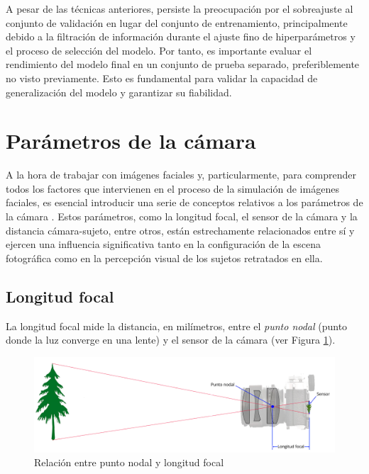 A pesar de las técnicas anteriores, persiste la preocupación por el sobreajuste al conjunto de validación en lugar del conjunto de entrenamiento, principalmente debido a la filtración de información durante el ajuste fino de hiperparámetros y el proceso de selección del modelo. Por tanto, es importante evaluar el rendimiento del modelo final en un conjunto de prueba separado, preferiblemente no visto previamente. Esto es fundamental para validar la capacidad de generalización del modelo y garantizar su fiabilidad.


\section{Parámetros de la cámara}

A la hora de trabajar con imágenes faciales y, particularmente, para comprender todos los factores que intervienen en el proceso de la simulación de imágenes faciales, es esencial introducir una serie de conceptos relativos a los parámetros de la cámara \cite{51,67,68,69}. Estos parámetros, como la longitud focal, el sensor de la cámara y la distancia cámara-sujeto, entre otros, están estrechamente relacionados entre sí y ejercen una influencia significativa tanto en la configuración de la escena fotográfica como en la percepción visual de los sujetos retratados en ella.

\subsection*{Longitud focal}
La longitud focal mide la distancia, en milímetros, entre el \textit{punto nodal} (punto donde la luz converge en una lente) y el sensor de la cámara (ver Figura \ref{fig11}). 

\begin{figure}[h]
	\centering
	\includegraphics[scale=0.2]{imagenes/cap2/focal.png}
	\caption[Relación entre punto nodal y longitud focal.]{Relación entre punto nodal y longitud focal \cite{44}}
	\label{fig11}
\end{figure}

